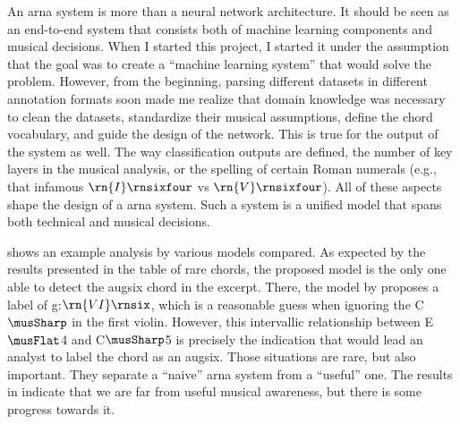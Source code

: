 
An \gls{arna} system is more than a neural network
architecture. It should be seen as an end-to-end system that
consists both of machine learning components and musical
decisions. When I started this project, I started it under
the assumption that the goal was to create a ``machine
learning system'' that would solve the problem. However,
from the beginning, parsing different datasets in different
annotation formats soon made me realize that domain
knowledge was necessary to clean the datasets, standardize
their musical assumptions, define the chord vocabulary, and
guide the design of the network. This is true for the output
of the system as well. The way classification outputs are
defined, the number of key layers in the musical analysis,
or the spelling of certain Roman numerals (e.g., that
infamous $\rn{I}\rnsixfour$ vs $\rn{V}\rnsixfour$). All of
these aspects shape the design of a \gls{arna} system. Such
a system is a unified model that spans both technical and
musical decisions.

 shows an example analysis by
various models compared. As expected by the results
presented in the table of rare chords, the proposed model is
the only one able to detect the \gls{augsix} chord in the
excerpt. There, the model by \textcite{mcleod2021modular}
proposes a label of g:$\rn{VI}\rnsix$, which is a reasonable
guess when ignoring the C$\musSharp$ in the first violin.
However, this intervallic relationship between E$\musFlat$4
and C$\musSharp$5 is precisely the indication that would
lead an analyst to label the chord as an \gls{augsix}. Those
situations are rare, but also important. They separate a
``naive'' \gls{arna} system from a ``useful'' one. The
results in  indicate that we are far
from useful musical awareness, but there is some progress
towards it.

